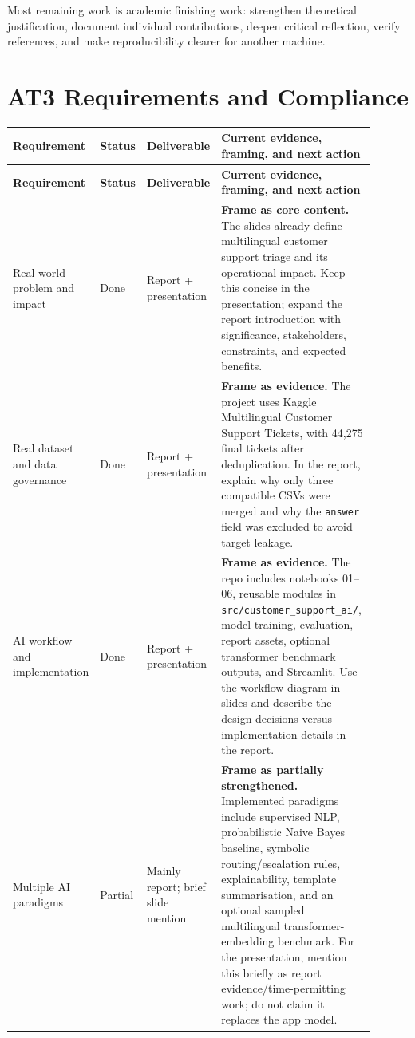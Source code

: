 \documentclass[11pt,a4paper]{article}
\newcommand{\done}{\textcolor{green!45!black}{Done}}
\newcommand{\partialstatus}{\textcolor{orange!80!black}{Partial}}
\begin{document}
Most remaining work is academic finishing work: strengthen theoretical justification, document individual contributions, deepen critical reflection, verify references, and make reproducibility clearer for another machine.

\section{AT3 Requirements and Compliance}
\small
\renewcommand{\arraystretch}{1.18}
\begin{longtable}{>{\raggedright\arraybackslash}p{0.18\linewidth} >{\raggedright\arraybackslash}p{0.11\linewidth} >{\raggedright\arraybackslash}p{0.16\linewidth} >{\raggedright\arraybackslash}p{0.45\linewidth}}
\toprule
\textbf{Requirement} & \textbf{Status} & \textbf{Deliverable} & \textbf{Current evidence, framing, and next action} \\
\midrule
\endfirsthead
\toprule
\textbf{Requirement} & \textbf{Status} & \textbf{Deliverable} & \textbf{Current evidence, framing, and next action} \\
\midrule
\endhead
Real-world problem and impact & \done & Report + presentation & \textbf{Frame as core content.} The slides already define multilingual customer support triage and its operational impact. Keep this concise in the presentation; expand the report introduction with significance, stakeholders, constraints, and expected benefits. \\
\addlinespace
Real dataset and data governance & \done & Report + presentation & \textbf{Frame as evidence.} The project uses Kaggle Multilingual Customer Support Tickets, with 44,275 final tickets after deduplication. In the report, explain why only three compatible CSVs were merged and why the \texttt{answer} field was excluded to avoid target leakage. \\
\addlinespace
AI workflow and implementation & \done & Report + presentation & \textbf{Frame as evidence.} The repo includes notebooks 01--06, reusable modules in \texttt{src/customer\_support\_ai/}, model training, evaluation, report assets, optional transformer benchmark outputs, and Streamlit. Use the workflow diagram in slides and describe the design decisions versus implementation details in the report. \\
\addlinespace
Multiple AI paradigms & \partialstatus & Mainly report; brief slide mention & \textbf{Frame as partially strengthened.} Implemented paradigms include supervised NLP, probabilistic Naive Bayes baseline, symbolic routing/escalation rules, explainability, template summarisation, and an optional sampled multilingual transformer-embedding benchmark. For the presentation, mention this briefly as report evidence/time-permitting work; do not claim it replaces the app model. \\

\end{longtable}
\end{document}
